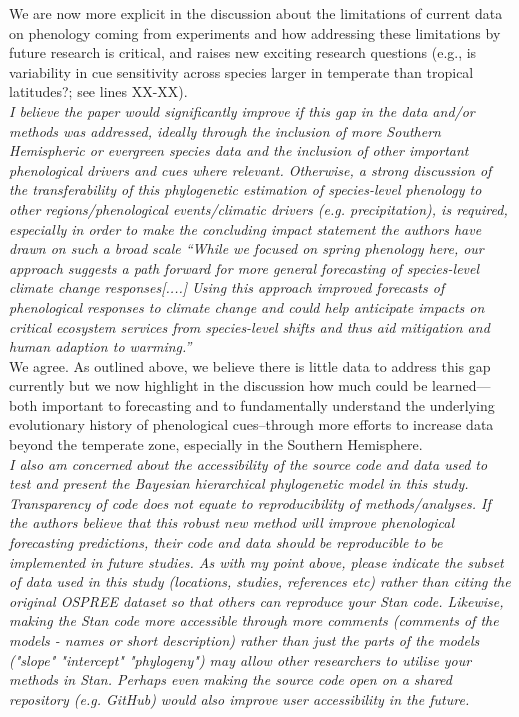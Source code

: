 \documentclass[11pt]{article}
\begin{document}
We are now more explicit in the discussion about the limitations of current data on phenology coming from experiments and how addressing these limitations by future research is critical, and raises new exciting research questions (e.g., is variability in cue sensitivity across species larger in temperate than tropical latitudes?; see lines XX-XX). \\


\emph{I believe the paper would significantly improve if this gap in the data and/or methods was addressed, ideally through the inclusion of more Southern Hemispheric or evergreen species data and the inclusion of other important phenological drivers and cues where relevant. Otherwise, a strong discussion of the transferability of this phylogenetic estimation of species-level phenology to other regions/phenological events/climatic drivers (e.g. precipitation), is required, especially in order to make the concluding impact statement the authors have drawn on such a broad scale “While we focused on spring phenology here, our approach suggests a path forward for more general forecasting of species-level climate change responses[....] Using this approach improved forecasts of phenological responses to climate change and could help anticipate impacts on critical ecosystem services from species-level shifts and thus aid mitigation and human adaption to warming.”}\\

We agree. As outlined above, we believe there is little data to address this gap currently but we now highlight in the discussion how much could be learned---both important to forecasting and to fundamentally understand the underlying evolutionary history of phenological cues--through more efforts to increase data beyond the temperate zone, especially in the Southern Hemisphere. \\ %

\emph{I also am concerned about the accessibility of the source code and data used to test and present the Bayesian hierarchical phylogenetic model in this study. Transparency of code does not equate to reproducibility of methods/analyses. If the authors believe that this robust new method will improve phenological forecasting predictions, their code and data should be reproducible to be implemented in future studies. As with my point above, please indicate the subset of data used in this study (locations, studies, references etc) rather than citing the original OSPREE dataset so that others can reproduce your Stan code. Likewise, making the Stan code more accessible through more comments (comments of the models - names or short description) rather than just the parts of the models ("slope" "intercept" "phylogeny") may allow other researchers to utilise your methods in Stan. Perhaps even making the source code open on a shared repository (e.g. GitHub) would also improve user accessibility in the future.}\\
\end{document}
